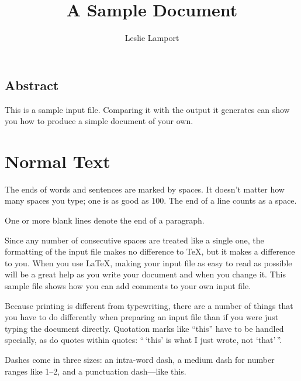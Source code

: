 \documentclass{river-journal}
\begin{document}
\begin{opening}
\title{A Sample Document}
\author{Leslie Lamport}
\end{opening}


\subsection*{Abstract}
This is a sample input file.  Comparing it with the output it
generates can show you how to produce a simple document of
your own.


\section{Normal Text}

The ends  of words and sentences are marked
  by   spaces. It  doesn't matter how many
spaces    you type; one is as good as 100.  The
end of   a line counts as a space.

One   or more   blank lines denote the  end
of  a paragraph.

Since any number of consecutive spaces are treated like a single
one, the formatting of the input file makes no difference to
      \TeX,         %
but it makes a difference to you.
When you use
      \LaTeX,       %
making your input file as easy to read as possible
will be a great help as you write your document and when you
change it.  This sample file shows how you can add comments to
your own input file.

Because printing is different from typewriting, there are a
number of things that you have to do differently when preparing
an input file than if you were just typing the document directly.
Quotation marks like
       ``this''
have to be handled specially, as do quotes within quotes:
       ``\,`this'                  %
    is what I just
    wrote, not  `that'\,''.

Dashes come in three sizes: an
       intra-word
dash, a medium dash for number ranges like
       1--2,
and a punctuation
       dash---like
this.
\end{document}
